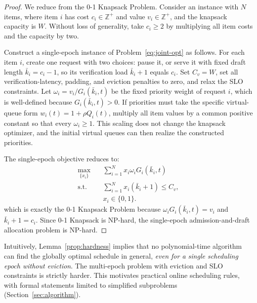 \documentclass[journal]{IEEEtran}
\begin{document}
\begin{proof}
We reduce from the 0-1 Knapsack Problem. Consider an 
instance with $N$ items, where item $i$ has cost 
$c_i \in \mathbb{Z}^+$ and value $v_i \in \mathbb{Z}^+$, 
and the knapsack capacity is $W$. Without loss of 
generality, take $c_i \geq 2$ by multiplying all item 
costs and the capacity by two.

Construct a single-epoch instance of 
Problem~\eqref{eq:joint-opt} as follows. For each item 
$i$, create one request with two choices: pause it, or 
serve it with fixed draft length $\bar{k}_i=c_i-1$, so 
its verification load $\bar{k}_i+1$ equals $c_i$. Set 
$C_v=W$, set all verification-latency, padding, and 
eviction penalties to zero, and relax the SLO constraints. 
Let $\omega_i=v_i/G_i(\bar{k}_i,t)$ be the fixed priority 
weight of request $i$, which is well-defined because 
$G_i(\bar{k}_i,t)>0$. If priorities must take the specific 
virtual-queue form $w_i(t)=1+\rho Q_i(t)$, multiply all item 
values by a common positive constant so that every 
$\omega_i\geq 1$. This scaling does not change the 
knapsack optimizer, and the initial virtual queues can then 
realize the constructed priorities.

The single-epoch objective reduces to:
\begin{equation}
  \begin{aligned}
  \max_{\{x_i\}} \quad & 
  \sum_{i=1}^{N} x_i \omega_i G_i(\bar{k}_i,t) \\
  \text{s.t.} \quad & 
  \sum_{i=1}^{N} x_i(\bar{k}_i{+}1) \leq C_v, \\
  & x_i \in \{0,1\}.
  \end{aligned}
\end{equation}
which is exactly the 0-1 Knapsack Problem because 
$\omega_i G_i(\bar{k}_i,t)=v_i$ and 
$\bar{k}_i+1=c_i$. Since 0-1 Knapsack is NP-hard, the 
single-epoch admission-and-draft allocation problem is 
NP-hard.
\end{proof}

Intuitively, Lemma~\ref{prop:hardness} implies 
that no polynomial-time algorithm can find the globally 
optimal schedule in general, \emph{even for a single 
scheduling epoch without eviction}. The multi-epoch 
problem with eviction and SLO constraints is strictly 
harder. This motivates practical online scheduling rules, 
with formal statements limited to simplified subproblems 
(Section~\ref{sec:algorithm}).


\end{document}
